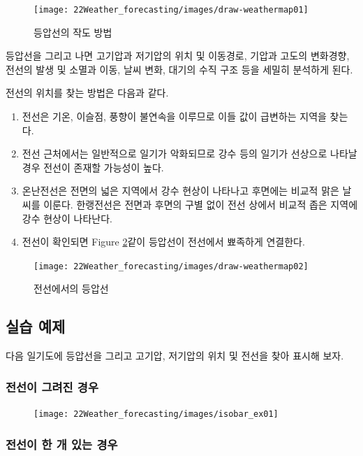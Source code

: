 \begin{figure}[h]
	\centering
	\texttt{[image: 22Weather\_forecasting/images/draw-weathermap01]}
	\caption{등압선의 작도 방법}
	\label{fig:drawweathermap01}
\end{figure}

등압선을 그리고 나면 고기압과 저기압의 위치 및 이동경로, 기압과 고도의 변화경향, 전선의 발생 및 소멸과 이동, 날씨 변화, 대기의 수직 구조 등을 세밀히 분석하게 된다. 

전선의 위치를 찾는 방법은 다음과 같다.

\begin{enumerate}
 \item 전선은 기온, 이슬점, 풍향이 불연속을 이루므로 이들 값이 급변하는 지역을 찾는다.
 \item 전선 근처에서는 일반적으로 일기가 악화되므로 강수 등의 일기가 선상으로 나타날 경우 전선이 존재할 가능성이 높다. 
 \item 온난전선은 전면의 넓은 지역에서 강수 현상이 나타나고 후면에는 비교적 맑은 날씨를 이룬다. 한랭전선은 전면과 후면의 구별 없이 전선 상에서 비교적 좁은 지역에 강수 현상이 나타난다.
 \item 전선이 확인되면 Figure \ref{fig:drawweathermap02}\와 같이 등압선이 전선에서 뾰족하게 연결한다.
\end{enumerate}

\begin{figure}[h]
	\centering
	\texttt{[image: 22Weather\_forecasting/images/draw-weathermap02]}
	\caption{전선에서의 등압선}
	\label{fig:drawweathermap02}
\end{figure}

\newpage
\subsection{실습 예제}
다음 일기도에 등압선을 그리고 고기압, 저기압의 위치 및 전선을 찾아 표시해 보자.

\subsubsection{전선이 그려진 경우}

\begin{figure}[h]\center
	\centering
	\texttt{[image: 22Weather\_forecasting/images/isobar\_ex01]}
	\label{fig:isobar_ex01}
\end{figure}

\newpage
\subsubsection{전선이 한 개 있는 경우}

